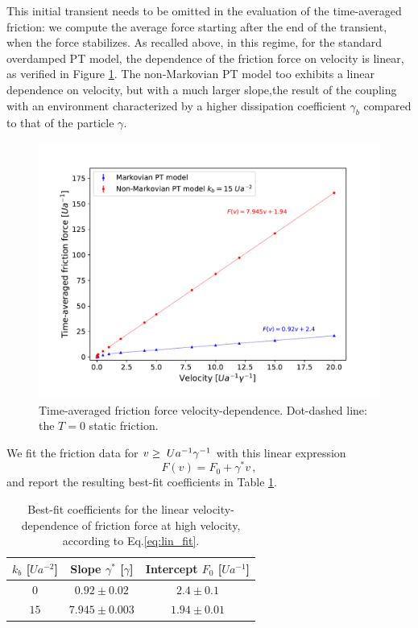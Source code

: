 This initial transient needs to be omitted in the evaluation of the time-averaged friction: we compute the average force starting after the end of the transient, when the force stabilizes. As recalled above, in this regime, for the standard overdamped PT model, the dependence of the friction force on velocity is linear, as verified in Figure \ref{fig:high_velo_friction}. The non-Markovian PT model too exhibits a linear dependence on velocity, but with a much larger slope,the result of the coupling with an environment characterized by a higher dissipation coefficient $\gamma_b$ compared to that of the particle $\gamma$.
\begin{figure}
    \centering
    \includegraphics[width=\textwidth]{tot_lineare.pdf}
    \caption{Time-averaged friction force velocity-dependence. Dot-dashed line: the $T=0$ static friction.}
    \label{fig:high_velo_friction}
\end{figure} 
We fit the friction data for $v \geq \hspace{0.1cm}Ua^{-1}\gamma^{-1}$  with this linear expression
\begin{equation}
    F(v)=F_0 + \gamma^{*} v \, ,
    \label{eq:lin_fit}
\end{equation}
and report the resulting best-fit coefficients in Table \ref{tab:valori_gammaeff}.
\begin{table}
\centering 
\begin{tabular}{ccc}
    \toprule
    $k_b$ [$U a ^{-2}$] & Slope $\gamma^{*}$  [$\gamma$]& Intercept  $F_0$ [$U a ^{-1}$]\\
    \midrule 
    $0$ & $0.92 \pm 0.02$ & $2.4 \pm 0.1$\\
    $15$ & $7.945 \pm 0.003$ & $1.94 \pm 0.01 $\\
    \bottomrule
\end{tabular}
\caption{Best-fit coefficients for the linear velocity-dependence of friction force at high velocity, according to Eq.\;\eqref{eq:lin_fit}.}
\label{tab:valori_gammaeff}
\end{table}
